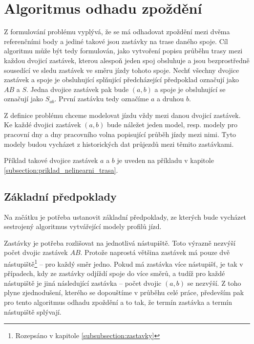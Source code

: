 \section{Algoritmus odhadu zpoždění}


Z formulování problému vyplývá, že se má odhadovat zpoždění mezi dvěma referenčními body a jediné takové jsou zastávky na trase daného spoje. Cíl algoritmu může být tedy formulován, jako vytvoření popisu průběhu trasy mezi každou dvojicí zastávek, kterou alespoň jeden spoj obsluhuje a jsou bezprostředně sousedící ve sledu zastávek ve směru jízdy tohoto spoje. Nechť všechny dvojice zastávek a spoje je obsluhující splňující předcházející předpoklad označují jako $AB$ a $S$. Jedna dvojice zastávek pak bude $(a, b)$ a spoje je obsluhující se označují jako $S_{ab}$. První zastávku tedy označíme $a$ a druhou $b$.


\bigbreak


Z definice problému chceme modelovat jízdu vždy mezi danou dvojicí zastávek. Ke každé dvojici zastávek $(a, b)$ bude náležet jeden model, resp. modely pro pracovní dny a dny pracovního volna popisující průběh jízdy mezi nimi. Tyto modely budou vycházet z historických dat průjezdů mezi těmito zastávkami.


\bigbreak


Příklad takové dvojice zastávek $a$ a $b$ je uveden na příkladu v kapitole \ref{subsection:priklad_nelinearni_trasa}.


\subsection{Základní předpoklady} \label{section:zakladni_predpoklady}


Na začátku je potřeba ustanovit základní předpoklady, ze kterých bude vycházet sestrojený algoritmus vytvářející modely profilů jízd.


\bigbreak


Zastávky je potřeba rozlišovat na jednotlivá nástupiště. Toto výrazně nezvýší počet dvojic zastávek $AB$. Protože naprostá většina zastávek má pouze dvě nástupiště\footnote{Rozepsáno v kapitole \ref{subsubsection:zastavky}} -- pro každý směr jedno. Pokud má zastávka více nástupišť, je tak v případech, kdy ze zastávky odjíždí spoje do více směrů, a tudíž pro každé nástupiště je jiná následující zastávka -- počet dvojic $(a, b)$ se nezvýší. Z toho plyne zjednodušení, kterého se dopouštíme v průběhu celé práce, především pak pro tento algoritmus odhadu zpoždění a to tak, že termín zastávka a termín nástupiště splývají.



